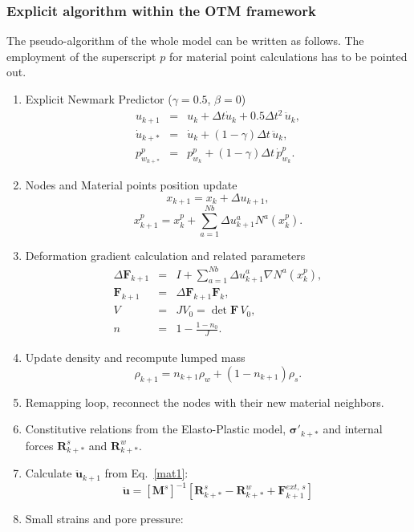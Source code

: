 \documentclass[twocolumn]{svjour3}          %
\begin{document}
\subsubsection{Explicit algorithm within the OTM framework} \label{subsec:421}
The pseudo-algorithm of the whole model can be written as follows. The employment of the superscript $p$ for material point calculations has to be pointed out.
\begin{enumerate}
\item  Explicit Newmark Predictor ($\gamma=0.5$, $\beta=0$)
\begin{eqnarray*}
u_{k+1} &=&u_k+\Delta t \dot{u}_{k}+0.5\Delta t^2 \, \ddot{u}_k, \\
\dot{u}_{k+*}&=&\dot{u}_{k}+(1-\gamma)\Delta t \,  \ddot{u}_{k}, \\
p^p_{w_{k+*}} &=&p^p_{w_k}+(1-\gamma)\Delta t \, \dot{p}^p_{w_k}.
\end{eqnarray*}
\item  Nodes and Material points position update
$$
x_{k+1}=x_{k}+\Delta u_{k+1},
$$
$$
x_{k+1}^p=x_{k}^p+\sum_{a=1}^{Nb}\Delta u_{k+1}^a N^a(x^p_{k}).
$$
\item Deformation gradient calculation and related parameters
\begin{eqnarray*}
\Delta \mathbf{F}_{k+1} &=& I+\sum_{a=1}^{Nb}\Delta u_{k+1}^a \nabla N^a(x_{k}^p), \\
\mathbf{F}_{k+1} &=& \Delta \mathbf{F}_{k+1} \mathbf{F}_{k}, \\
V&=&JV_0=\det \mathbf{F} \, V_0,\\
n&=&1-\frac{1-n_0}{J}.
\end{eqnarray*}
\item Update density and recompute lumped mass
$$
\rho_{k+1}=n_{k+1}\rho_{w}+(1-n_{k+1})\rho_s.
$$
\item Remapping loop, reconnect the nodes with their new material neighbors.
\item Constitutive relations from the  Elasto-Plastic model, $\boldsymbol{\sigma'}_{k+*}$ and internal forces $\boldsymbol{R}^s_{k+*}$ and $\boldsymbol{R}^w_{k+*}$.
\item Calculate $\boldsymbol{\ddot{u}}_{k+1}$ from Eq.~\eqref{mat1}:
$$
\ddot{\boldsymbol{u}} =  \left[\boldsymbol{M}^s \right]^{-1}\left[\boldsymbol{R}^s_{k+*}- \boldsymbol{R}^w_{k+*} + \boldsymbol{F}^{ext, \, s}_{k+1}\right]
$$
\item  Small strains and pore pressure:

\end{enumerate}
\end{document}
